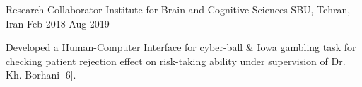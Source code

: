 \begin{cventries}
  \cventry
    {Research Collaborator}  %
    {Institute for Brain and Cognitive Sciences} %
    {SBU, Tehran, Iran} %
    {Feb 2018-Aug 2019} %
    {
      \begin{cvitems} %
        \item{Developed a Human-Computer Interface for cyber-ball \& Iowa gambling task for checking patient rejection effect on risk-taking ability under supervision of Dr. Kh. Borhani [6].}
      \end{cvitems}
    }


\end{cventries}
